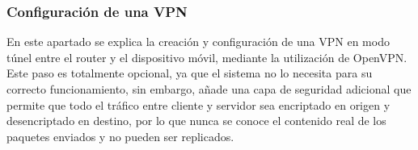 \documentclass[12pt]{article}
\begin{document}

        \subsubsection{Configuración de una VPN} 
            En este apartado se explica la creación y configuración de una VPN en modo túnel entre el router y el dispositivo móvil, mediante la utilización de OpenVPN. Este paso es totalmente opcional, ya que el sistema no lo necesita para su correcto funcionamiento, sin embargo, añade una capa de seguridad adicional que permite que todo el tráfico entre cliente y servidor sea encriptado en origen y desencriptado en destino, por lo que nunca se conoce el contenido real de los paquetes enviados y no pueden ser replicados.
\end{document}
